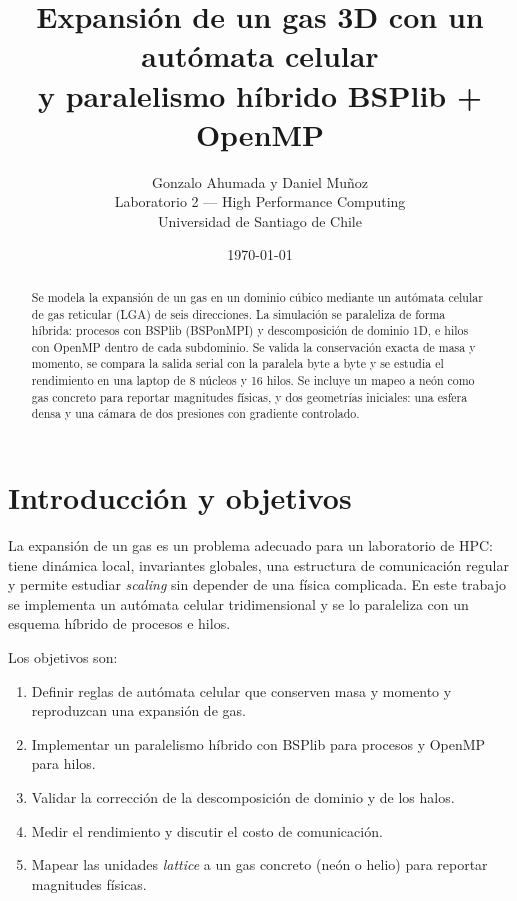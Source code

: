 \documentclass[11pt,a4paper]{article}
\title{Expansión de un gas 3D con un autómata celular\\y paralelismo híbrido BSPlib + OpenMP}
\author{Gonzalo Ahumada y Daniel Muñoz\\[2mm]
Laboratorio 2 --- High Performance Computing\\
Universidad de Santiago de Chile}
\date{\today}
\begin{document}
\maketitle

\begin{abstract}
Se modela la expansión de un gas en un dominio cúbico mediante un autómata
celular de gas reticular (LGA) de seis direcciones. La simulación se paraleliza
de forma híbrida: procesos con BSPlib (BSPonMPI) y descomposición de dominio
1D, e hilos con OpenMP dentro de cada subdominio. Se valida la conservación
exacta de masa y momento, se compara la salida serial con la paralela byte a
byte y se estudia el rendimiento en una laptop de 8 núcleos y 16 hilos. Se
incluye un mapeo a neón como gas concreto para reportar magnitudes físicas, y
dos geometrías iniciales: una esfera densa y una cámara de dos presiones con
gradiente controlado.
\end{abstract}

\tableofcontents
\newpage

\section{Introducción y objetivos}

La expansión de un gas es un problema adecuado para un laboratorio de HPC:
tiene dinámica local, invariantes globales, una estructura de comunicación
regular y permite estudiar \emph{scaling} sin depender de una física
complicada. En este trabajo se implementa un autómata celular tridimensional y
se lo paraleliza con un esquema híbrido de procesos e hilos.

Los objetivos son:

\begin{enumerate}[leftmargin=*]
  \item Definir reglas de autómata celular que conserven masa y momento y
        reproduzcan una expansión de gas.
  \item Implementar un paralelismo híbrido con BSPlib para procesos y OpenMP
        para hilos.
  \item Validar la corrección de la descomposición de dominio y de los halos.
  \item Medir el rendimiento y discutir el costo de comunicación.
  \item Mapear las unidades \emph{lattice} a un gas concreto (neón o helio)
        para reportar magnitudes físicas.
\end{enumerate}
\end{document}
